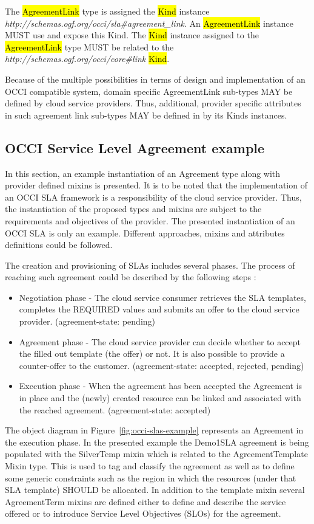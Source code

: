 \documentclass[10pt,a4paper]{article}
\begin{document}
The \hl{AgreementLink} type is assigned the \hl{Kind} instance \textit{http://schemas.ogf.org/occi/sla\#agreement\_link}. An \hl{AgreementLink} instance MUST use and expose this Kind. The \hl{Kind} instance assigned to the \hl{AgreementLink} type MUST be related to the \textit{http://schemas.ogf.org/occi/core\#link} \hl{Kind}.

Because of the multiple possibilities in terms of design and implementation of an OCCI compatible system, domain specific AgreementLink sub-types MAY be defined by cloud service providers. Thus, additional, provider specific attributes in such agreement link sub-types MAY be defined in by its Kinds instances. 


\subsection{OCCI Service Level Agreement example}

In this section, an example instantiation of an Agreement type along with provider defined mixins is presented. It is to be noted that the implementation of an OCCI SLA framework is a responsibility of the cloud service provider. Thus, the instantiation of the proposed types and mixins are subject to the requirements and objectives of the provider. The presented instantiation of an OCCI SLA is only an example. Different approaches, mixins and attributes definitions could be followed.

The creation and provisioning of SLAs includes several phases.  The process of reaching such agreement could be described by the following steps :
\begin{itemize}
\item Negotiation phase - The cloud service consumer retrieves the SLA templates, completes the REQUIRED values and submits an offer to the cloud service provider. (agreement-state: pending)
\item Agreement phase - The cloud service provider can decide whether to accept the filled out template (the offer) or not. It is also possible to provide a counter-offer to the customer. (agreement-state: accepted, rejected, pending)
\item Execution phase - When the agreement has been accepted the Agreement is in place and the (newly) created resource can be linked and associated with the reached agreement. (agreement-state: accepted)	
\end{itemize}
The object diagram in Figure~\ref{fig:occi-slas-example} represents an Agreement in the execution phase. In the presented example the Demo1SLA agreement is being populated with the SilverTemp mixin which is related to the AgreementTemplate Mixin type. This is used to tag and classify the agreement as well as to define some generic constraints such as the region in which the resources (under that SLA template) SHOULD be allocated. In addition to the template mixin several AgreementTerm mixins are defined either to define and describe the service offered or to introduce Service Level Objectives (SLOs) for the agreement. 
\end{document}
